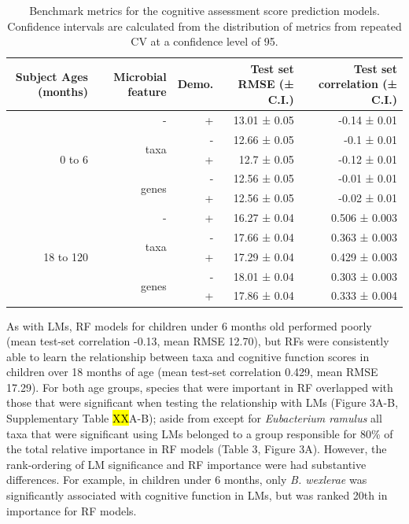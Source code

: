 \documentclass{article}
\begin{document}
\begin{table}[!h]
    \begin{center}
    \begin{tabular}{|r|r|r|r|r|}
      \hline\hline
      \textbf{Subject Ages (months)} & \textbf{Microbial feature} & \textbf{Demo.} & \textbf{Test set RMSE (± C.I.)} & \textbf{Test set correlation (± C.I.)} \\\hline
      \multirow{5}{*}{0 to 6} & - & + & 13.01 ± 0.05 & -0.14 ± 0.01 \\ \cline{2-5}
            & \multirow{2}{*}{taxa} & - & 12.66 ± 0.05 & -0.1 ± 0.01 \\ \cline{3-5}
            &       & + & 12.7 ± 0.05 & -0.12 ± 0.01 \\ \cline{2-5}
            & \multirow{2}{*}{genes} & - & 12.56 ± 0.05 & -0.01 ± 0.01 \\ \cline{3-5}
            &       & + & 12.56 ± 0.05 & -0.02 ± 0.01 \\ \cline{1-5}
      \multirow{5}{*}{18 to 120} & - & + & 16.27 ± 0.04 & 0.506 ± 0.003 \\ \cline{2-5}
            & \multirow{2}{*}{taxa} & - & 17.66 ± 0.04 & 0.363 ± 0.003 \\ \cline{3-5}
            &       & + & 17.29 ± 0.04 & 0.429 ± 0.003 \\ \cline{2-5}
            & \multirow{2}{*}{genes} & - & 18.01 ± 0.04 & 0.303 ± 0.003 \\ \cline{3-5}
            &       & + & 17.86 ± 0.04 & 0.333 ± 0.004 \\\hline\hline
    \end{tabular}
    \caption{\label{tab:rfbench}Benchmark metrics for the cognitive assessment score
    prediction models. Confidence intervals are calculated from the
    distribution of metrics from repeated CV at a confidence level of 95.}
    \end{center}
\end{table}

As with LMs, RF models for children under 6 months old
performed poorly (mean test-set correlation -0.13, mean RMSE 12.70),
but RFs were consistently able to learn the relationship between taxa
and cognitive function scores in children over 18 months of age (mean
test-set correlation 0.429, mean RMSE 17.29). For both age groups,
species that were important in RF overlapped with those that were
significant when testing the relationship with LMs (Figure
3A-B, Supplementary Table \hl{XX}A-B); aside from except for \emph{Eubacterium ramulus}
all taxa that were significant using LMs belonged to a group
responsible for 80\% of the total relative importance in RF models
(Table 3, Figure 3A).
However, the rank-ordering of LM significance and RF importance
were had substantive differences. For example, in children under 6 months,
only \emph{B. wexlerae} was significantly associated with cognitive function in LMs, but
was ranked 20th in importance for RF models. 
\end{document}
